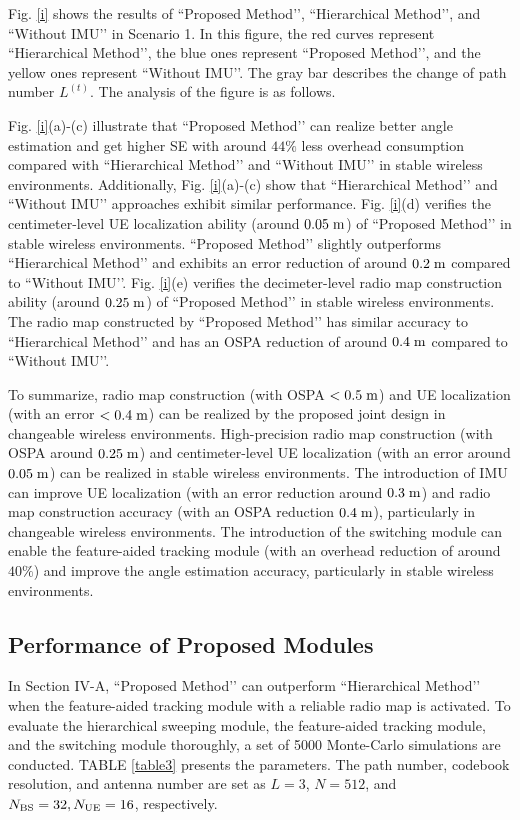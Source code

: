 \documentclass[journal,12pt,onecolumn,draftclsnofoot,]{IEEEtran}
\begin{document}
{Fig. \ref{i} shows the results of ``Proposed Method’’, ``Hierarchical Method’’, and ``Without IMU’’ in Scenario 1. 
In this figure, the red curves represent ``Hierarchical Method’’, the blue ones represent ``Proposed Method’’, and the yellow ones represent ``Without IMU’’. 
The gray bar describes the change of path number $L^{(t)}$. The analysis of the figure is as follows. 

Fig. \ref{i}(a)-(c) illustrate that ``Proposed Method’’ can realize better angle estimation and get higher SE with around $44\%$ less overhead consumption compared with ``Hierarchical Method’’ and ``Without IMU’’ in stable wireless environments. 
Additionally, Fig. \ref{i}(a)-(c) show that ``Hierarchical Method’’ and ``Without IMU’’ approaches exhibit similar performance. 
Fig. \ref{i}(d) verifies the centimeter-level UE localization ability (around $0.05\;{\rm m}$) of ``Proposed Method’’ in stable wireless environments. 
``Proposed Method’’ slightly outperforms ``Hierarchical Method’’ and exhibits an error reduction of around $0.2\;{\rm m}$ compared to ``Without IMU’’. 
Fig. \ref{i}(e) verifies the decimeter-level radio map construction ability (around $0.25\;{\rm m}$) of ``Proposed Method’’ in stable wireless environments. 
The radio map constructed by ``Proposed Method’’ has similar accuracy to ``Hierarchical Method’’ and has an OSPA reduction of around $0.4\;{\rm m}$ compared to ``Without IMU’’.
}

To summarize, radio map construction (with OSPA $<0.5 \;{\rm m}$) and UE localization (with an error $<0.4 \;{\rm m}$) can be realized by the proposed joint design in changeable wireless environments. 
High-precision radio map construction (with OSPA around $ 0.25\; {\rm m}$) and centimeter-level UE localization (with an error around $0.05 \;{\rm m}$) can be realized in stable wireless environments. 
The introduction of IMU can improve UE localization (with an error reduction around $0.3\;{\rm m}$) and radio map construction accuracy (with an OSPA reduction $0.4\;{\rm m}$), particularly in changeable wireless environments. 
The introduction of the switching module can enable the feature-aided tracking module (with an overhead reduction of around $ 40\%$) and improve the angle estimation accuracy, particularly in stable wireless environments. 


\subsection{Performance of Proposed Modules}
\vspace{-1.5mm}
In Section IV-A, ``Proposed Method’’ can outperform ``Hierarchical Method’’ when the feature-aided tracking module with a reliable radio map is activated. 
To evaluate the hierarchical sweeping module, the feature-aided tracking module, and the switching module thoroughly, a set of 5000 Monte-Carlo simulations are conducted. 
TABLE \ref{table3} presents the parameters. The path number, codebook resolution, and antenna number are set as $L=3$, $N=512$, and $N_{\rm BS}=32,N_{\rm UE}=16$, respectively.
\end{document}
